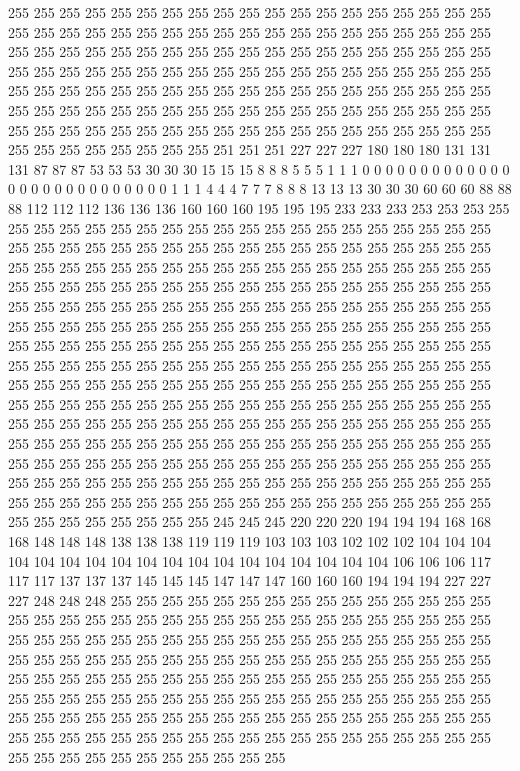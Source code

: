 255 255 255 255 255 255 255 255 255 255 255 255 255 255 255 255 255 255 255 255 255 255 255 255 255 255 255 255 255 255 255 255 255 255 255 255 255 255 255 255 255 255 255 255 255 255 255 255 255 255 255 255 255 255 255 255 255 255 255 255 255 255 255 255 255 255 255 255 255 255 255 255 255 255 255 255 255 255 255 255 255 255 255 255 255 255 255 255 255 255 255 255 255 255 255 255 255 255 255 255 255 255 255 255 255 255 255 255 255 255 255 255 255 255 255 255 255 255 255 255 255 255 255 255 255 255 255 255 
255 255 255 255 255 255 255 255 255 255 255 255 255 251 251 251 227 227 227 180 180 180 131 131 131 87 87 87 53 53 53 30 30 30 15 15 15 8 8 8 5 5 5 1 1 1 0 0 0 0 0 0 0 0 0 0 0 0 0 0 0 0 0 0 0 0 0 0 0 0 0 0 0 1 1 1 4 4 4 7 7 7 8 8 8 13 13 13 30 30 30 60 60 60 88 88 88 112 112 112 136 136 136 160 160 160 195 195 195 233 233 233 253 253 253 255 255 255 255 255 255 255 255 255 255 255 255 255 
255 255 255 255 255 255 255 255 255 255 255 255 255 255 255 255 255 255 255 255 255 255 255 255 255 255 255 255 255 255 255 255 255 255 255 255 255 255 255 255 255 255 255 255 255 255 255 255 255 255 255 255 255 255 255 255 255 255 255 255 255 255 255 255 255 255 255 255 255 255 255 255 255 255 255 255 255 255 255 255 255 255 255 255 255 255 255 255 255 255 255 255 255 255 255 255 255 255 255 255 255 255 255 255 255 255 255 255 255 255 255 255 255 255 255 255 255 255 255 255 255 255 255 255 255 255 255 255 
255 255 255 255 255 255 255 255 255 255 255 255 255 255 255 255 255 255 255 255 255 255 255 255 255 255 255 255 255 255 255 255 255 255 255 255 255 255 255 255 255 255 255 255 255 255 255 255 255 255 255 255 255 255 255 255 255 255 255 255 255 255 255 255 255 255 255 255 255 255 255 255 255 255 255 255 255 255 255 255 255 255 255 255 255 255 255 255 255 255 255 255 255 255 255 255 255 255 255 255 255 255 255 255 255 255 255 255 255 255 255 255 255 255 255 255 255 255 255 255 255 255 255 255 255 255 255 255 
255 255 255 255 255 255 255 255 255 255 255 255 255 255 255 255 255 255 255 255 255 255 255 255 255 245 245 245 220 220 220 194 194 194 168 168 168 148 148 148 138 138 138 119 119 119 103 103 103 102 102 102 104 104 104 104 104 104 104 104 104 104 104 104 104 104 104 104 104 104 106 106 106 117 117 117 137 137 137 145 145 145 147 147 147 160 160 160 194 194 194 227 227 227 248 248 248 255 255 255 255 255 255 255 255 255 255 255 255 255 255 255 255 255 255 255 255 255 255 255 255 255 255 255 255 255 255 255 
255 255 255 255 255 255 255 255 255 255 255 255 255 255 255 255 255 255 255 255 255 255 255 255 255 255 255 255 255 255 255 255 255 255 255 255 255 255 255 255 255 255 255 255 255 255 255 255 255 255 255 255 255 255 255 255 255 255 255 255 255 255 255 255 255 255 255 255 255 255 255 255 255 255 255 255 255 255 255 255 255 255 255 255 255 255 255 255 255 255 255 255 255 255 255 255 255 255 255 255 255 255 255 255 255 255 255 255 255 255 255 255 255 255 255 255 255 255 255 255 255 255 255 255 255 255 255 255 

